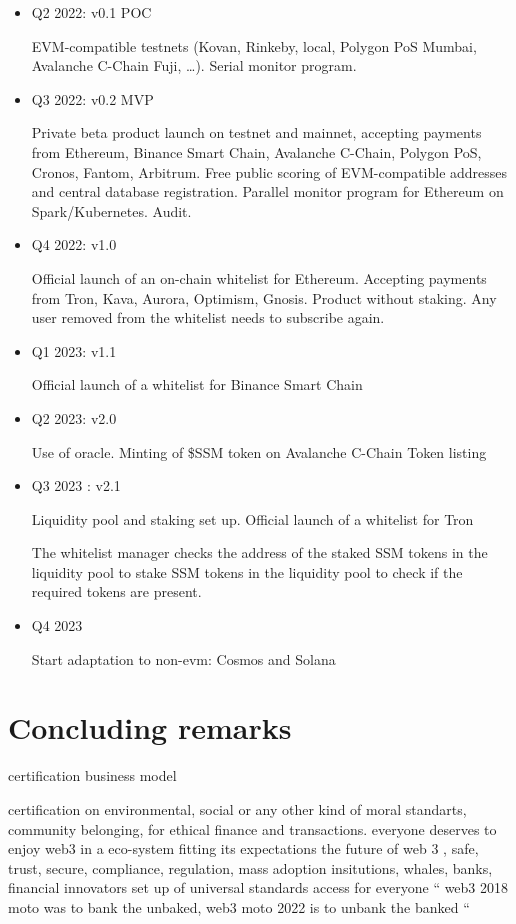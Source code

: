 ﻿\documentclass[a4paper]{article}
\begin{document}
\begin{itemize}
\item Q2 2022:  v0.1 POC 

EVM-compatible testnets (Kovan, Rinkeby, local, Polygon PoS Mumbai, Avalanche C-Chain Fuji, …). Serial monitor program. 

\item Q3 2022: v0.2 MVP

Private beta product launch on testnet and mainnet, accepting payments from Ethereum, Binance Smart Chain, Avalanche C-Chain, Polygon PoS, Cronos, Fantom, Arbitrum. 
Free public scoring of EVM-compatible addresses and central database registration.
Parallel monitor program for Ethereum on Spark/Kubernetes.
Audit.

\item Q4 2022: v1.0

Official launch of an on-chain whitelist for Ethereum. Accepting payments from Tron, Kava, Aurora, Optimism, Gnosis. 
Product without staking. Any user removed from the whitelist needs to subscribe again.

\item Q1 2023: v1.1

Official launch of a whitelist  for Binance Smart Chain 

\item Q2 2023: v2.0

Use of oracle.
Minting of \$SSM token on Avalanche C-Chain
Token listing

\item Q3 2023 : v2.1

Liquidity pool and staking set up. 
Official launch of a whitelist for Tron

The whitelist manager checks the address of the staked SSM tokens in the liquidity pool to stake SSM tokens in the liquidity pool to check if the required tokens are present.

\item Q4 2023

Start adaptation to non-evm: Cosmos and Solana
\end{itemize}

\section{Concluding remarks}
certification business model

certification on environmental, social or any other kind of moral standarts, community belonging, for ethical finance and transactions.
everyone deserves to enjoy web3 in a eco-system fitting its expectations
the future of web 3 , safe, trust, secure, compliance, regulation, mass adoption
insitutions, whales, banks, financial innovators
set up of universal standards
access for everyone
“ web3 2018 moto was to bank the unbaked, web3 moto 2022 is to unbank the banked “
\end{document}
